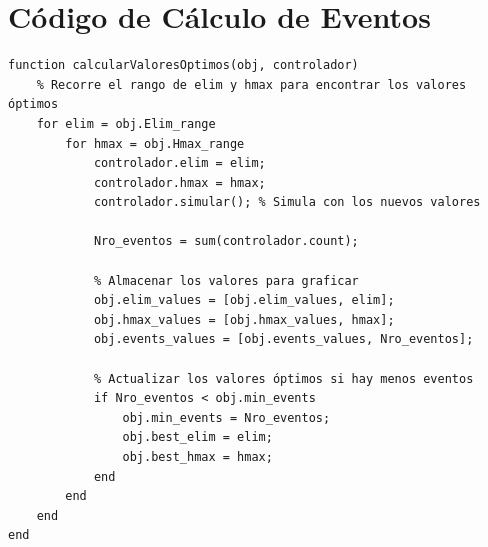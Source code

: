 \documentclass[conference]{IEEEtran}
\begin{document}
\appendix
\section{C\'odigo de C\'alculo de Eventos}
\begin{scriptsize}
\begin{verbatim}
function calcularValoresOptimos(obj, controlador)
    % Recorre el rango de elim y hmax para encontrar los valores óptimos
    for elim = obj.Elim_range
        for hmax = obj.Hmax_range
            controlador.elim = elim;
            controlador.hmax = hmax;
            controlador.simular(); % Simula con los nuevos valores
            
            Nro_eventos = sum(controlador.count);

            % Almacenar los valores para graficar
            obj.elim_values = [obj.elim_values, elim];
            obj.hmax_values = [obj.hmax_values, hmax];
            obj.events_values = [obj.events_values, Nro_eventos];

            % Actualizar los valores óptimos si hay menos eventos
            if Nro_eventos < obj.min_events
                obj.min_events = Nro_eventos;
                obj.best_elim = elim;
                obj.best_hmax = hmax;
            end
        end
    end
end
\end{verbatim}
\end{scriptsize}
\end{document}
